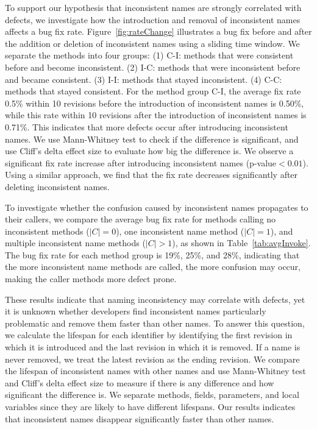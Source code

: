 To support our hypothesis that inconsistent names are strongly correlated with defects, we investigate how the introduction and removal of inconsistent names affects a bug fix rate. Figure~\ref{fig:rateChange}  illustrates a bug fix before and after the addition or deletion of inconsistent names using a sliding time window.  We separate the methods into four groups: (1) C-I: methods that were consistent before and become inconsistent. (2)  I-C: methods that were inconsistent before and became consistent. (3) I-I: methods that stayed inconsistent.  (4) C-C: methods that stayed consistent. 
For the method group C-I, the average fix rate 0.5\% within 10 revisions before the introduction of inconsistent names is 0.50\%, while this rate within 10 revisions after the introduction of inconsistent names is 0.71\%. This indicates that more defects occur after introducing inconsistent names. We use Mann-Whitney test to check if the difference is significant, and use Cliff's delta effect size to evaluate how big the difference is. We observe a significant fix rate increase after introducing inconsistent names (p-value$<0.01$). Using a similar approach, we find that the fix rate decreases significantly after deleting inconsistent names. 


To investigate whether the confusion caused by inconsistent names propagates to their callers, we compare the average bug fix rate for methods calling no inconsistent methods ($|C|=0$), one inconsistent name method ($|C|=1$), and multiple inconsistent name methods ($|C|>1$), as shown in Table~\ref{tab:avgInvoke}. The bug fix rate for each method group is 19\%, 25\%, and 28\%, indicating that the more inconsistent name methods are called, the more confusion may occur, making the caller methods more defect prone. 

 These results indicate that naming inconsistency may correlate with defects, yet it is unknown whether developers find inconsistent names particularly problematic and remove them faster than other names. To answer this question, we calculate the lifespan for each identifier by identifying the first revision in which it is introduced and the last revision in which it is removed. If a name is never removed, we treat the latest revision as the ending revision. We compare the lifespan of inconsistent names with other names and use Mann-Whitney test and Cliff's delta effect size to measure if there is any difference and how significant the difference is. 
We separate methods, fields, parameters, and local variables since they are likely to have different lifespans. Our results indicates that inconsistent  names disappear significantly faster than other names. 


